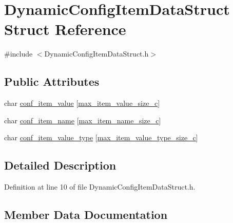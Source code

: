 \hypertarget{structDynamicConfigItemDataStruct}{}\section{Dynamic\+Config\+Item\+Data\+Struct Struct Reference}
\label{structDynamicConfigItemDataStruct}


{\ttfamily \#include $<$Dynamic\+Config\+Item\+Data\+Struct.\+h$>$}

\subsection*{Public Attributes}
\begin{DoxyCompactItemize}
\item 
char \hyperlink{structDynamicConfigItemDataStruct_a4959e12c0fab44e54a8edc4dde9e6386}{conf\+\_\+item\+\_\+value} \mbox{[}\hyperlink{DynamicConfigItemDataStruct_8h_a856963f31e35df3fa9c1dc12c397f6be}{max\+\_\+item\+\_\+value\+\_\+size\+\_\+c}\mbox{]}
\item 
char \hyperlink{structDynamicConfigItemDataStruct_ab6daf678bb97c46fe6a18c7da629b448}{conf\+\_\+item\+\_\+name} \mbox{[}\hyperlink{DynamicConfigItemDataStruct_8h_a36ad3a2b20f9ec19b16064c421b6e953}{max\+\_\+item\+\_\+name\+\_\+size\+\_\+c}\mbox{]}
\item 
char \hyperlink{structDynamicConfigItemDataStruct_ac63f92a24fff751ddcf49be5eae1fc0d}{conf\+\_\+item\+\_\+value\+\_\+type} \mbox{[}\hyperlink{DynamicConfigItemDataStruct_8h_abe9e708509ade3a5605d85dd5c0593ce}{max\+\_\+item\+\_\+value\+\_\+type\+\_\+size\+\_\+c}\mbox{]}
\end{DoxyCompactItemize}


\subsection{Detailed Description}


Definition at line 10 of file Dynamic\+Config\+Item\+Data\+Struct.\+h.



\subsection{Member Data Documentation}
